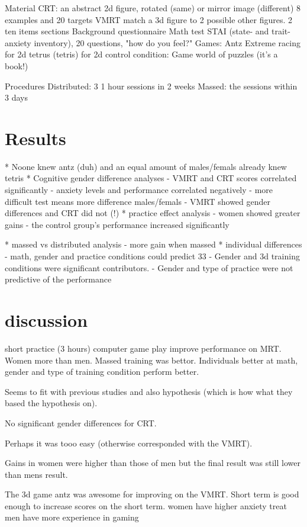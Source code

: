 Material
CRT: an abstract 2d figure, rotated (same) or mirror image (different)
8 examples and 20 targets
VMRT match a 3d figure to 2 possible other figures.
2 ten items sections
Background questionnaire
Math test 
STAI (state- and trait-anxiety inventory), 
20 questions, "how do you feel?" 
Games:
Antz Extreme racing for 2d 
tetrus (tetris) for 2d
control condition: Game world of puzzles (it's a book!)

Procedures
Distributed: 3 1 hour sessions in 2 weeks 
Massed: the sessions within 3 days

\section{Results}
* Noone knew antz (duh) and an equal amount of males/femals already knew tetris
* Cognitive gender difference analyses 
 - VMRT and CRT scores correlated significantly
 - anxiety levels and performance correlated negatively
 - more difficult test means more difference males/femals
 - VMRT showed gender differences and CRT did not (!)
* practice effect analysis
 - women showed greater gains
 - the control group's performance increased significantly
 
* massed vs distributed analysis
 - more gain when massed
* individual differences
 - math, gender and practice conditions could predict 33%
 - Gender and 3d training conditions were significant contributors. 
 - Gender and type of practice were not predictive of the performance

\section{discussion}
short practice (3 hours) computer game play improve performance on 
MRT. Women more than men. Massed training was bettor. 
Individuals better at math, gender and type of training condition perform 
better. 

 Seems to fit with previous studies and also hypothesis (which is how what 
 they based the hypothesis on). 

No significant gender differences for CRT. 

 Perhaps it was tooo easy 
 (otherwise corresponded with the VMRT).

Gains in women were higher than those of men but the final result was 
 still lower than mens result.


The 3d game antz was awesome for improving on the VMRT.   
Short term is good enough to increase scores on the short term.
women have higher anxiety treat
men have more experience in gaming

